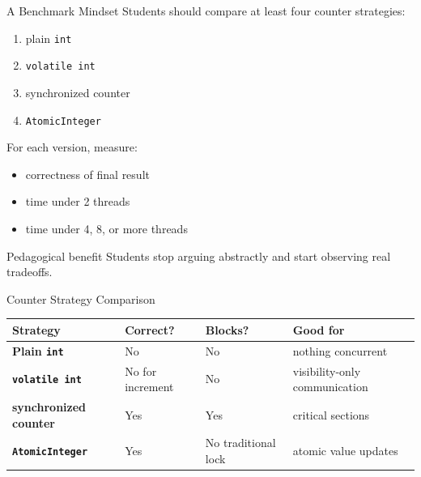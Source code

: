 \documentclass[aspectratio=169,11pt]{beamer}
\begin{document}
	\begin{frame}{A Benchmark Mindset}
		Students should compare at least four counter strategies:
		
		\begin{enumerate}
			\item plain \texttt{int}
			\item \texttt{volatile int}
			\item synchronized counter
			\item \texttt{AtomicInteger}
		\end{enumerate}
		
		\vspace{0.35cm}
		
		For each version, measure:
		\begin{itemize}
			\item correctness of final result
			\item time under 2 threads
			\item time under 4, 8, or more threads
		\end{itemize}
		
		\vspace{0.35cm}
		
		\begin{alertblock}{Pedagogical benefit}
			Students stop arguing abstractly and start observing real tradeoffs.
		\end{alertblock}
	\end{frame}
	
	\begin{frame}{Counter Strategy Comparison}
		\centering
		\begin{tabular}{>{\bfseries}m{3.2cm} >{\centering\arraybackslash}m{1.8cm} >{\centering\arraybackslash}m{1.8cm} >{\centering\arraybackslash}m{2.1cm}}
			\toprule
			Strategy & Correct? & Blocks? & Good for \\
			\midrule
			Plain \texttt{int} & No & No & nothing concurrent \\
			\texttt{volatile int} & No for increment & No & visibility-only communication \\
			synchronized counter & Yes & Yes & critical sections \\
			\texttt{AtomicInteger} & Yes & No traditional lock & atomic value updates \\
			\bottomrule
		\end{tabular}
	\end{frame}
	
\end{document}
